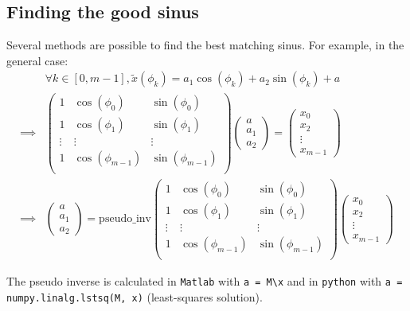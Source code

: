 \documentclass[12pt,a4paper]{article}
\begin{document}
	\subsection{Finding the good sinus}
	Several methods are possible to find the best matching sinus. For example, in the general case:
	\begin{align}
		&\forall k \in [0,m-1], \tilde{x}(\phi_k) = a_1 \cos(\phi_k) + a_2 \sin(\phi_k) + a \nonumber \\
		\implies &
		\begin{pmatrix}
			1 & \cos(\phi_0) & \sin(\phi_0) \\
			1 & \cos(\phi_1) & \sin(\phi_1) \\
			\vdots & \vdots & \vdots \\
			1 & \cos(\phi_{m-1}) & \sin(\phi_{m-1}) \\
		\end{pmatrix}
		\begin{pmatrix}
			a \\ a_1 \\ a_2
		\end{pmatrix}
		=
		\begin{pmatrix}
			x_0 \\ x_2 \\ \vdots \\ x_{m-1}
		\end{pmatrix} \nonumber
		\\
		\implies &
		\begin{pmatrix}
		a \\ a_1 \\ a_2
		\end{pmatrix}
		= 
		\mathrm{pseudo\_inv}
		\begin{pmatrix}
		1 & \cos(\phi_0) & \sin(\phi_0) \\
		1 & \cos(\phi_1) & \sin(\phi_1) \\
		\vdots & \vdots & \vdots \\
		1 & \cos(\phi_{m-1}) & \sin(\phi_{m-1}) \\
		\end{pmatrix}
		\begin{pmatrix}
		x_0 \\ x_2 \\ \vdots \\ x_{m-1}
		\end{pmatrix}
	\end{align}
		
	The pseudo inverse is calculated in \texttt{Matlab} with \texttt{a = M\textbackslash x} and in \texttt{python} with \texttt{a = numpy.linalg.lstsq(M, x)} (least-squares solution).
	
\end{document}
